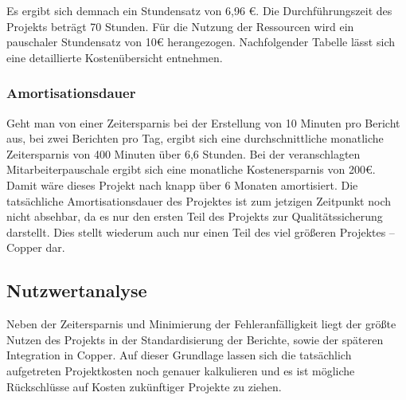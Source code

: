 
Es ergibt sich demnach ein Stundensatz von 6,96 €. Die Durchführungszeit des Projekts beträgt 70 Stunden. Für die Nutzung der Ressourcen wird ein pauschaler Stundensatz von 10€ herangezogen. Nachfolgender Tabelle lässt sich eine detaillierte Kostenübersicht entnehmen.

\subsubsection{Amortisationsdauer}
\label{sec:Amortisationsdauer}
Geht man von einer Zeitersparnis bei der Erstellung von 10 Minuten pro Bericht aus, bei zwei Berichten pro Tag, ergibt sich eine durchschnittliche monatliche Zeitersparnis von 400 Minuten über 6,6 Stunden. Bei der veranschlagten Mitarbeiterpauschale ergibt sich eine monatliche Kostenersparnis von 200€. Damit wäre dieses Projekt nach knapp über 6 Monaten amortisiert.
Die tatsächliche Amortisationsdauer des Projektes ist zum jetzigen Zeitpunkt noch nicht absehbar, da es nur den ersten Teil des Projekts zur Qualitätssicherung darstellt. Dies stellt wiederum auch nur einen Teil des viel größeren Projektes – Copper dar.

\subsection{Nutzwertanalyse}
\label{sec:Nutzwertanalyse}
Neben der Zeitersparnis und Minimierung der Fehleranfälligkeit liegt der größte Nutzen des Projekts in der Standardisierung der Berichte, sowie der späteren Integration in Copper. Auf dieser Grundlage lassen sich die tatsächlich aufgetreten Projektkosten noch genauer kalkulieren und es ist mögliche Rückschlüsse auf Kosten zukünftiger Projekte zu ziehen.


